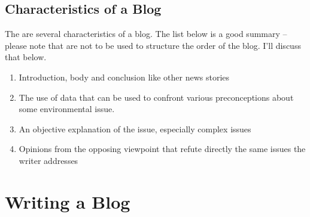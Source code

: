 \documentclass{tufte-handout}\usepackage[]{graphicx}\usepackage[]{color}
\begin{document}
\subsection{Characteristics of a Blog}

The are several characteristics of a blog. The list below is a good summary -- please note that are not to be used to structure the order of the blog. I'll discuss that below. 

\begin{enumerate}
	\item Introduction, body and conclusion like other news stories
	\item The use of data that can be used to confront various preconceptions about some environmental issue.
	\item An objective explanation of the issue, especially complex issues
	\item Opinions from the opposing viewpoint that refute directly the same issues the writer addresses
\end{enumerate}



 

\section{Writing a Blog}
\end{document}
